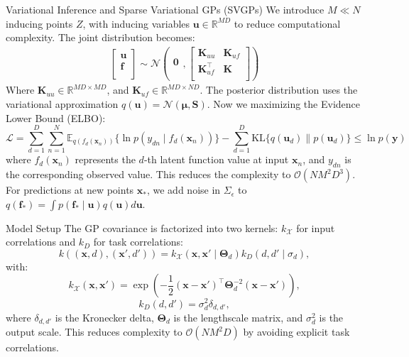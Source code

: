 \begin{frame}{Variational Inference and Sparse Variational GPs (SVGPs)}
	We introduce $M \ll N$ inducing points $Z$, with inducing variables $\mathbf{u} \in \mathbb{R}^{MD}$ to reduce computational complexity. The joint distribution becomes:
	\[
	\begin{array}{rcl}
		\left[ \begin{array}{c}
			\mathbf{u}\\
			\mathbf{f}\\
		\end{array}
		\right]
		\sim
		\mathcal{N} \left(
		\begin{array}{c}
			\mathbf{0}\\
		\end{array},
		\left[ \begin{array}{cc}
			\mathbf{K}_{uu} & \mathbf{K}_{uf}\\
			\mathbf{K}_{uf}^\top & \mathbf{K}\\
		\end{array}
		\right] \right)
	\end{array}
	\]
	Where $\mathbf{K}_{uu} \in \mathbb{R}^{MD \times MD}$, and $\mathbf{K}_{uf} \in \mathbb{R}^{MD \times ND}$. The posterior distribution uses the variational approximation $q(\mathbf{u}) = \mathcal{N}(\boldsymbol{\mu}, \mathbf{S})$. Now we maximizing the Evidence Lower Bound (ELBO):
	\begin{equation*}
		\mathcal{L} = \sum_{d=1}^D \sum_{n=1}^N \mathbb{E}_{q(f_d(\mathbf{x}_n))}\{\ln p(y_{dn} \mid f_d(\mathbf{x}_n))\} - \sum_{d=1}^D \text{KL}\{q(\mathbf{u}_d) \parallel p(\mathbf{u}_d)\} \leq \ln p(\mathbf{y})
	\end{equation*}
	where $f_d(\mathbf{x}_n)$ represents the $d$-th latent function value at input $\mathbf{x}_n$, and $y_{dn}$ is the corresponding observed value. This reduces the complexity to $\mathcal{O}(NM^2D^3)$. For predictions at new points $\mathbf{x}_*$, we add noise in $\Sigma_\epsilon$ to $q(\mathbf{f}_*) = \int p(\mathbf{f}_* \mid \mathbf{u}) q(\mathbf{u}) d\mathbf{u}$.
\end{frame}

\begin{frame}{Model Setup}
	The GP covariance is factorized into two kernels: $k_{\mathcal{X}}$ for input correlations and $k_{D}$ for task correlations:
	\[
	k\left((\bm{x}, d), (\bm{x}', d')\right) = k_{\mathcal{X}}\left(\bm{x}, \bm{x}' \mid \bm{\Theta}_d \right) k_{D}\left(d, d' \mid \sigma_d \right),
	\]
	with:
	\[
	k_{\mathcal{X}}\left(\bm{x}, \bm{x}'\right) = \exp\left(-\frac{1}{2}(\bm{x} - \bm{x}')^\top \bm{\Theta}_d^{-2} (\bm{x} - \bm{x}')\right),
	\]
	\[
	k_{D}(d, d') = \sigma^2_d \delta_{d, d'},
	\]
	where $\delta_{d, d'}$ is the Kronecker delta, $\bm{\Theta}_d$ is the lengthscale matrix, and $\sigma^2_d$ is the output scale. This reduces complexity to $\mathcal{O}(NM^2D)$ by avoiding explicit task correlations.
\end{frame}



